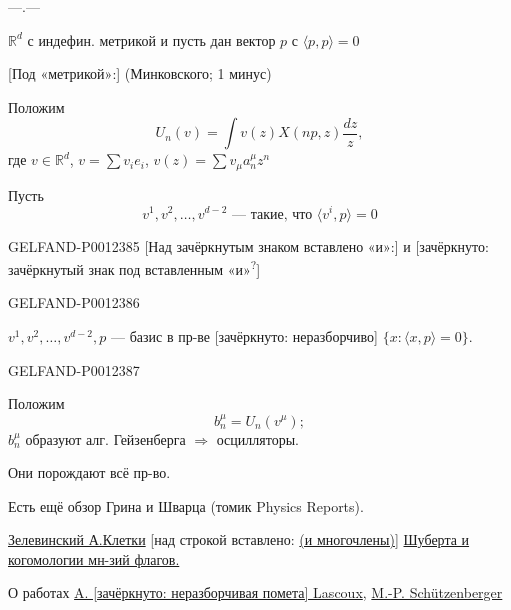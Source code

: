 \begin{center}—\quad .\quad —\end{center}

$\mathbb R^d$ с индефин. метрикой и пусть дан вектор $p$ с $\langle p,p\rangle=0$

[Под «метрикой»:] (Минковского; 1 минус)

Положим
\begin{equation*}
U_n(v)=\int v(z)X(np,z)\frac{dz}{z},
\tag{14}
\end{equation*}
где $v\in\mathbb R^d$, $v=\sum v_i e_i$, $v(z)=\sum v_\mu a_n^\mu z^n$

Пусть
\begin{equation*}
v^1,v^2,\ldots,v^{d-2}\text{ — такие, что }\langle v^i,p\rangle=0
\tag{15}
\end{equation*}
\begin{GelfandAdjacentEvidence}{GELFAND-P001238}{5}
[Над зачёркнутым знаком вставлено «и»:] и [зачёркнуто: зачёркнутый знак под вставленным «и»\textsuperscript{?}]
\end{GelfandAdjacentEvidence}
\begin{GelfandAdjacentEvidence}{GELFAND-P001238}{6}

$v^1,v^2,\ldots,v^{d-2},p$ — базис в пр-ве
[зачёркнуто: неразборчиво] $\{x:\langle x,p\rangle=0\}$.
\end{GelfandAdjacentEvidence}
\begin{GelfandAdjacentEvidence}{GELFAND-P001238}{7}


Положим
\begin{equation*}
b_n^\mu=U_n(v^\mu);
\tag{16}
\end{equation*}
$b_n^\mu$ образуют алг. Гейзенберга $\Rightarrow$ осцилляторы.

Они порождают всё пр-во.

Есть ещё обзор Грина и Шварца (томик Physics Reports).

\bigskip
\underline{Зелевинский А.}\qquad \underline{Клетки}
[над строкой вставлено: \underline{(и многочлены)}]
\underline{Шуберта и когомологии мн-зий флагов.}

О работах \underline{A. [зачёркнуто: неразборчивая помета] Lascoux}, \underline{M.-P. Schützenberger}
\end{GelfandAdjacentEvidence}
